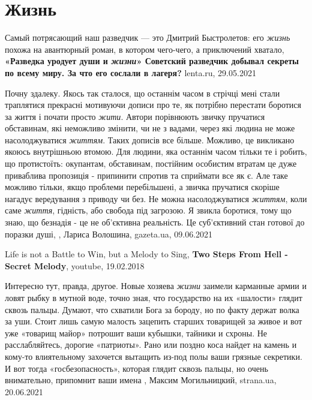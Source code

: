  
 
 
 
 
\chapter{Жизнь}

Самый потрясающий наш разведчик — это Дмитрий Быстролетов: его \emph{жизнь}
похожа на авантюрный роман, в котором чего-чего, а приключений хватало,
\textbf{«Разведка уродует души и \emph{жизни}» Советский разведчик добывал
секреты по всему миру. За что его сослали в лагеря?} lenta.ru, 29.05.2021

Почну здалеку. Якось так сталося, що останнім часом в стрічці мені стали
траплятися прекрасні мотивуючи дописи про те, як потрібно перестати боротися за
життя і почати просто \emph{жити}. Автори порівнюють звичку пручатися
обставинам, які неможливо змінити, чи не з вадами, через які людина не може
насолоджуватися \emph{життям}. Таких дописів все більше. Можливо, це викликано
якоюсь внутрішньою втомою. Для людини, яка останнім часом тільки те і робить,
що протистоїть: окупантам, обставинам, постійним особистим втратам це дуже
приваблива пропозиція - припинити спротив та сприймати все як є. Але таке
можливо тільки, якщо проблеми перебільшені, а звичка пручатися скоріше нагадує
вередування з приводу чи без. Не можна насолоджуватися \emph{життям}, коли саме
\emph{життя}, гідність, або свобода під загрозою. Я звикла боротися, тому що
знаю, що безнадія - це не об'єктивна реальність. Це суб'єктивний стан готової
до поразки душі, , Лариса Волошина, gazeta.ua, 09.06.2021

Life is not a Battle to Win, but a Melody to Sing,
\textbf{Two Steps From Hell - Secret Melody},
youtube, 19.02.2018

Интересно тут, правда, другое. Новые хозяева \emph{жизни} заимели карманные армии и
ловят рыбку в мутной воде, точно зная, что государство на их «шалости» глядит
сквозь пальцы.  Думают, что схватили Бога за бороду, но по факту держат волка
за уши. Стоит лишь самую малость зацепить старших товарищей за живое и вот уже
«товарищ майор» потрошит ваши кубышки, тайники и схроны.  Не расслабляйтесь,
дорогие «патриоты». Рано или поздно коса найдет на камень и кому-то
влиятельному захочется вытащить из-под полы ваши грязные секретики. И вот тогда
«госбезопасность», которая глядит сквозь пальцы, но очень внимательно,
припомнит ваши имена
, 
Максим Могильницкий, strana.ua, 20.06.2021

